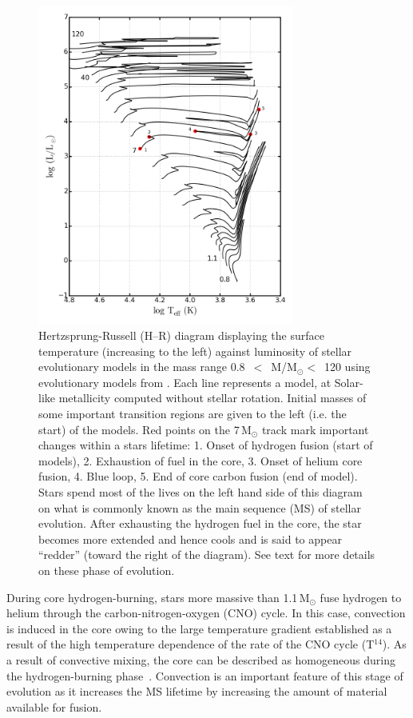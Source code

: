 \begin{figure}
 \centering
 \includegraphics[width=0.75\textwidth]{intro/HRD-geneva}
 \caption[Hertzsprung-Russell (H--R) diagram of stars]{
Hertzsprung-Russell (H--R) diagram displaying the surface temperature (increasing to the left) against luminosity of stellar evolutionary models in the mass range
0.8~$<$~M/M$_{\odot}<$~120 using evolutionary models from
\protect\citet{2012A&A...537A.146E}.
Each line represents a model, at Solar-like metallicity computed without stellar rotation.
Initial masses of some important transition regions are given to the left (i.e. the start) of the models.
Red points on the 7\,M$_{\odot}$ track mark important changes within a stars lifetime:
1. Onset of hydrogen fusion (start of models),
2. Exhaustion of fuel in the core,
3. Onset of helium core fusion,
4. Blue loop,
5. End of core carbon fusion (end of model).
Stars spend most of the lives on the left hand side of this diagram on what is commonly known as the main sequence (MS) of stellar evolution.
After exhausting the hydrogen fuel in the core, the star becomes more extended and hence cools and is said to appear ``redder'' (toward the right of the diagram).
See text for more details on these phase of evolution.
 \label{fig:HRD}}
\end{figure}


During core hydrogen-burning, stars more massive than 1.1\,M$_{\odot}$ fuse hydrogen to helium through the carbon-nitrogen-oxygen (CNO) cycle.
In this case, convection is induced in the core owing to the large temperature gradient established as a result of the high temperature dependence of the rate of the CNO cycle (T$^{14}$).
As a result of convective mixing, the core can be described as homogeneous during the hydrogen-burning phase~\citep{2012sse..book.....K}.
Convection is an important feature of this stage of evolution as it increases the MS lifetime by increasing the amount of material available for fusion.

